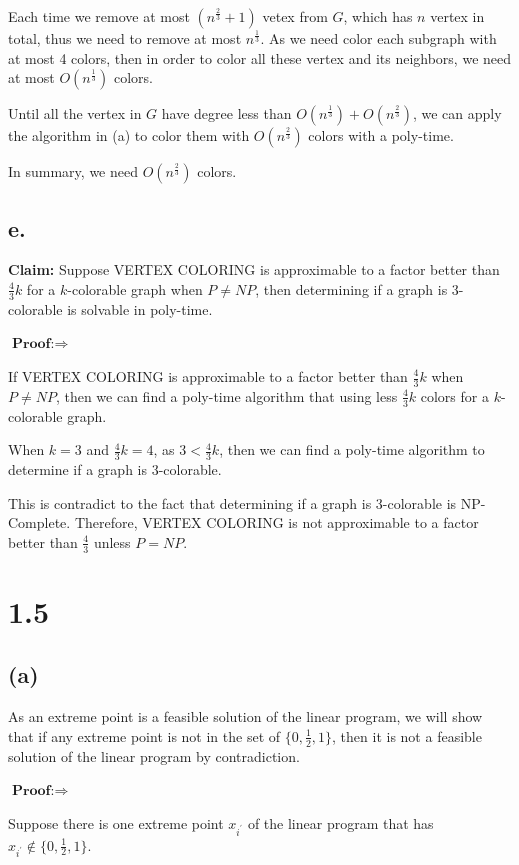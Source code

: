 \documentclass[a4paper,12pt]{article}
\begin{document}
Each time we remove at most $(n^{\frac{2}{3}}+1)$ vetex from $G$, which has $n$ vertex in total, thus we need to remove at most $ n^{\frac{1}{3}} $. As we need color each subgraph with at most 4 colors, then in order to color all these vertex and its neighbors, we need at most $O(n^{\frac{1}{3}})$ colors. 

Until all the vertex in $G$ have degree less than $O(n^{\frac{1}{3}})+O(n^{\frac{2}{3}})$, we can apply the algorithm in (a) to color them with $O(n^{\frac{2}{3}})$ colors with a poly-time.

In summary, we need $O(n^{\frac{2}{3}}) $ colors.

\subsection*{e. }
\noindent \textbf{Claim:}
Suppose VERTEX COLORING is approximable to a factor better than $\frac{4}{3} k$ for a $k$-colorable graph when $P \neq NP$, then determining if a graph is 3-colorable is solvable in poly-time.

$\textbf{Proof:} \Rightarrow $  

If VERTEX COLORING is approximable to a factor better than $\frac{4}{3} k$ when $P \neq NP$, then we can find a poly-time algorithm that using less $\frac{4}{3} k$ colors for a $k$-colorable graph. 

When $k=3$ and $\frac{4}{3} k=4$, as $ 3 < \frac{4}{3} k$, then we can find a poly-time algorithm to determine if a graph is 3-colorable.

This is contradict to the fact that determining if a graph is 3-colorable is NP-Complete. Therefore, VERTEX COLORING  is not approximable to a factor better than $\frac{4}{3}$ unless $P=NP$.
 

\section*{1.5 }
\subsection*{(a) }
As an extreme point is a feasible solution of the linear program, we will show that if any extreme point is not in the set of $\{0, \frac{1}{2}, 1\}$, then it is not a feasible solution of the linear program by contradiction.

$\textbf{Proof:} \Rightarrow $ 

Suppose there is one extreme point $x_{i^{\prime}}$ of the linear program that has $x_{i^{\prime}} \notin \{0, \frac{1}{2}, 1\}$. 
\end{document}
